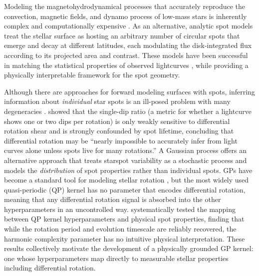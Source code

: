 \documentclass[preprint]{aastex702}
\begin{document}
Modeling the magnetohydrodynamical processes that accurately reproduce the convection, magnetic fields, and dynamo process of low-mass stars is inherently complex and computationally expensive \citep{miesch_threedimensional_2000,miesch_structure_2008,charbonneau_dynamo_2020}. As an alternative, analytic spot models \citep{kipping_analytic_2012,luger_starry_2019} treat the stellar surface as hosting an arbitrary number of circular spots that emerge and decay at different latitudes, each modulating the disk-integrated flux according to its projected area and contrast. These models have been successful in matching the statistical properties of observed lightcurves \citep{aigrain_testing_2015}, while providing a physically interpretable framework for the spot geometry.

Although there are approaches for forward modeling surfaces with spots, inferring information about \emph{individual} star spots is an ill-posed problem with many degeneracies \citep{luger_starry_2019,basri_information_2020}. \citet{basri_information_2020} showed that the single-dip ratio (a metric for whether a lightcurve shows one or two dips per rotation) is only weakly sensitive to differential rotation shear and is strongly confounded by spot lifetime, concluding that differential rotation may be ``nearly impossible to accurately infer from light curves alone unless spots live for many rotations.''
A Gaussian process \citep[GP;][]{rasmussen_gaussian_2006} offers an alternative approach that treats starspot variability as a stochastic process and models the \emph{distribution} of spot properties rather than individual spots.
GPs have become a standard tool for modeling stellar rotation \citep{angus_inferring_2018,foreman-mackey_fast_2017,gordon_stellar_2021}, but the most widely used quasi-periodic (QP) kernel has no parameter that encodes differential rotation, meaning that any differential rotation signal is absorbed into the other hyperparameters in an uncontrolled way. \citealt{nicholson_quasi-periodic_2022} systematically tested the mapping between QP kernel hyperparameters and physical spot properties, finding that while the rotation period and evolution timescale are reliably recovered, the harmonic complexity parameter has no intuitive physical interpretation. These results collectively motivate the development of a physically grounded GP kernel: one whose hyperparameters map directly to measurable stellar properties including differential rotation.
\end{document}
